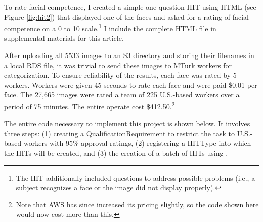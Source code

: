 To rate facial competence, I created a simple one-question HIT using HTML (see Figure \ref{fig:hit2}) that displayed one of the faces and asked for a rating of facial competence on a 0 to 10 scale.\footnote{The HIT additionally included questions to address possible problems (i.e., a subject recognizes a face or the image did not display properly).} I include the complete HTML file in supplemental materials for this article.

After uploading all 5533 images to an S3 directory and storing their filenames in a local RDS file, it was trivial to send these images to MTurk workers for categorization. To ensure reliability of the results, each face was rated by 5 workers. Workers were given 45 seconds to rate each face and were paid \$0.01 per face. The 27,665 images were rated a team of 225 U.S.-based workers over a period of 75 minutes. The entire operate cost \$412.50.\footnote{Note that AWS has since increased its pricing slightly, so the code shown here would now cost more than this.}

The entire code necessary to implement this project is shown below. It involves three steps: (1) creating a QualificationRequirement to restrict the task to U.S.-based workers with 95\% approval ratings, (2) registering a HITType into which the HITs will be created, and (3) the creation of a batch of HITs using .

